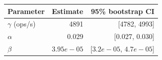\begin{tabular}{@{}lrr@{}}
\toprule
Parameter & Estimate & 95\% bootstrap CI \\
\midrule
$\gamma$ (ops/s) & 4891 & [4782, 4993] \\
$\alpha$ & 0.029 & [0.027, 0.030] \\
$\beta$ & $3.95e-05$ & [$3.2e-05$, $4.7e-05$] \\
\bottomrule
\end{tabular}
